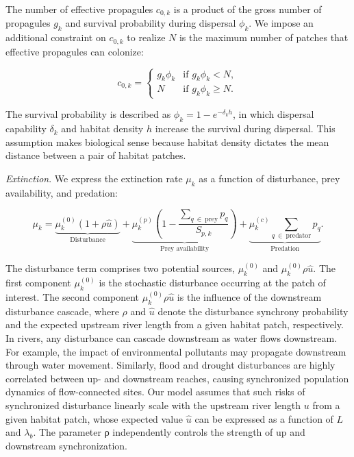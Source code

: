 \documentclass[11pt, class=article, crop=false]{standalone}
\begin{document}
The number of effective propagules $c_{0,k}$ is a product of the gross number of propagules $g_k$ and survival probability during dispersal $\phi_k$.
We impose an additional constraint on $c_{0,k}$ to realize $N$ is the maximum number of patches that effective propagules can colonize:

\begin{equation}
    c_{0, k} = 
    \begin{cases}
        g_k \phi_k & \text{if $g_k \phi_k < N$},\\
        N & \text{if $g_k \phi_k \ge N$}.
    \end{cases}
    \label{eq:c0-prod}
\end{equation}

The survival probability is described as $\phi_k = 1 - e^{-\delta_k h}$, in which dispersal capability $\delta_k$ and habitat density $h$ increase the survival during dispersal.
This assumption makes biological sense because habitat density dictates the mean distance between a pair of habitat patches.

\textit{Extinction}. We express the extinction rate $\mu_k$ as a function of disturbance, prey availability, and predation:

\begin{equation}
    \mu_{k} = 
        \underbrace{\mu_{k}^{(0)} (1 + \rho \hat{u})}_{\text{Disturbance}} + 
        \underbrace{\mu_{k}^{(p)} \left(1 - \frac{\sum_{q~\in~\text{prey}} p_{q}}{S_{p, k}} \right)}_{\text{Prey availability}} + 
        \underbrace{\mu_{k}^{(c)} \sum_{q~\in~\text{predator}} p_{q}}_{\text{Predation}}.
    \label{eq:extn}    
\end{equation}

The disturbance term comprises two potential sources, $\mu^{(0)}_k$ and $\mu^{(0)}_k \rho \hat{u}$.
The first component $\mu^{(0)}_k$ is the stochastic disturbance occurring at the patch of interest.
The second component $\mu^{(0)}_k \rho \hat{u}$ is the influence of the downstream disturbance cascade, where $\rho$ and $\hat{u}$ denote the disturbance synchrony probability and the expected upstream river length from a given habitat patch, respectively.
In rivers, any disturbance can cascade downstream as water flows downstream.
For example, the impact of environmental pollutants may propagate downstream through water movement.
Similarly, flood and drought disturbances are highly correlated between up- and downstream reaches, causing synchronized population dynamics of flow-connected sites.
Our model assumes that such risks of synchronized disturbance linearly scale with the upstream river length $u$ from a given habitat patch, whose expected value $\hat{u}$ can be expressed as a function of $L$ and $\lambda_b$.
The parameter ρ independently controls the strength of up and
downstream synchronization.
\end{document}
